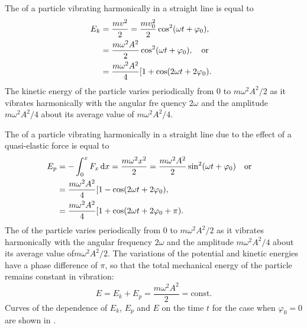 \subsection{}\label{28.2.2} The  of a particle vibrating harmonically in a straight line is equal to
\begin{align*}%
E_{k} & = \frac{mv^{2}}{2} = \frac{mv_{0}^{2}}{2} \cos^{2} (\omega t + \varphi_{0}),\\ 
&= \frac{m\omega^{2} A^{2}}{2} \cos^{2} (\omega t + \varphi_{0}), \qor \\
 & = \frac{m\omega^{2} A^{2}}{4} [1 + \cos (2\omega t + 2\varphi_{0}).
\end{align*}
The kinetic energy of the particle varies periodically from 0 to $m\omega^{2}A^{2}/2$ as it vibrates harmonically with the angular fre­ quency $2\omega$ and the amplitude $m\omega^{2}A^{2}/4$ about its average value of $m\omega^{2}A^{2}/4$.

The  of a particle vibrating harmonically in a straight line due to the effect of a quasi-elastic force is equal to
\begin{align*}%
E_{p} & = - \int_{0}^{x} F_{x}\, \dd x = \frac{m \omega^{2}x^{2}}{2} = \frac{m \omega^{2}A^{2}}{2} \sin^{2} (\omega t + \varphi_{0})\qor \\
 & = \frac{m\omega^{2} A^{2}}{4} [1 - \cos (2\omega t + 2\varphi_{0}),\\
& = \frac{m\omega^{2} A^{2}}{4} [1 + \cos (2\omega t + 2\varphi_{0} + \pi).
\end{align*}
The  of the particle varies periodically from 0 to $m\omega^{2}A^{2}/2$ as it vibrates harmonically with the angular frequency $2\omega$ and the amplitude $m\omega^{2}A^{2}/4$ about its average value of$m\omega^{2}A^{2}/2$. The variations of the potential and kinetic energies have a phase difference of $\pi$, so that the total mechanical energy of the particle remains constant in vibration:
\begin{equation*}%
E = E_{k} + E_{p} = \frac{m\omega^{2}A^{2}}{2} = \text{const.}
\end{equation*}
Curves of the dependence of $E_{k}$, $E_{p}$ and $E$ on the time $t$ for the case when $\varphi_{0} = 0$ are shown in .

